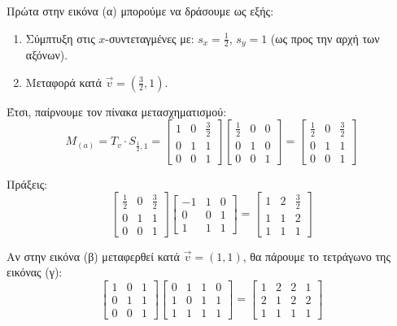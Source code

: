 \begin{solution}
Πρώτα στην εικόνα (α) μπορούμε να δράσουμε ως εξής:
\begin{enumerate}
    \item Σύμπτυξη στις $x$-συντεταγμένες με: \(s_x = \frac{1}{2}\), \(s_y = 1\) (ως προς την αρχή των αξόνων).
    \item Μεταφορά κατά \(\vec{v} = (\frac{3}{2},1) \).
\end{enumerate}

Έτσι, παίρνουμε τον πίνακα μετασχηματισμού:
\[
M_{(a)} = T_v \cdot S_{\frac{1}{2},1} = \begin{bmatrix}
1 & 0 & \frac{3}{2} \\
0 & 1 & 1 \\
0 & 0 & 1
\end{bmatrix}
\begin{bmatrix}
\frac{1}{2} & 0 & 0 \\
0 & 1 & 0 \\
0 & 0 & 1
\end{bmatrix} = \begin{bmatrix}
\frac{1}{2} & 0 & \frac{3}{2} \\
0 & 1 & 1 \\
0 & 0 & 1
\end{bmatrix}
\]

Πράξεις:
\[
\begin{bmatrix}
\frac{1}{2} & 0 & \frac{3}{2} \\
0 & 1 & 1 \\
0 & 0 & 1
\end{bmatrix}
\begin{bmatrix}
-1 & 1 & 0 \\
0 & 0 & 1 \\
1 & 1 & 1
\end{bmatrix} = \begin{bmatrix}
1 & 2 & \frac{3}{2} \\
1 & 1 & 2 \\
1 & 1 & 1
\end{bmatrix}
\]


Αν στην εικόνα (β) μεταφερθεί κατά \(\vec{v} = (1,1)\), θα πάρουμε το τετράγωνο της εικόνας (γ):
\[
\begin{bmatrix}
1 & 0 & 1 \\
0 & 1 & 1 \\
0 & 0 & 1
\end{bmatrix}
\begin{bmatrix}
0 & 1 & 1 & 0 \\
1 & 0 & 1 & 1 \\
1 & 1 & 1 & 1
\end{bmatrix} = \begin{bmatrix}
1 & 2 & 2 & 1 \\
2 & 1 & 2 & 2 \\
1 & 1 & 1 & 1
\end{bmatrix}
\]

\end{solution}
